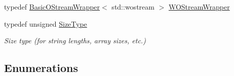 \begin{DoxyCompactItemize}
\item 
typedef \mbox{\hyperlink{classrapidjson_1_1_basic_o_stream_wrapper}{Basic\+O\+Stream\+Wrapper}}$<$ std\+::wostream $>$ \mbox{\hyperlink{namespacerapidjson_aed3cb4533d7293644a01ec707cf8282d}{W\+O\+Stream\+Wrapper}}
\item 
typedef unsigned \mbox{\hyperlink{namespacerapidjson_a44eb33eaa523e36d466b1ced64b85c84}{Size\+Type}}
\begin{DoxyCompactList}\small\item\em Size type (for string lengths, array sizes, etc.) \end{DoxyCompactList}\end{DoxyCompactItemize}
\subsection*{Enumerations}

